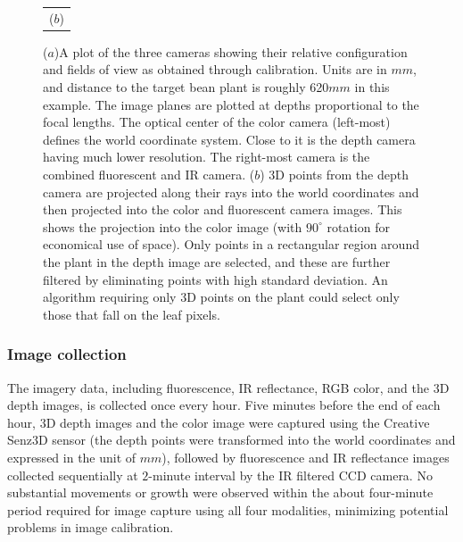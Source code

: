 \begin{figure}
\begin{tabular}{c}
  ($b$)\\
\end{tabular}
\caption{($a$)A plot of the three cameras showing their relative configuration and fields of view as obtained through calibration.  Units are in $mm$, and distance to the target bean plant is roughly 620$mm$ in this example.  The image planes are plotted at depths proportional to the focal lengths.  The optical center of the color camera (left-most) defines the world coordinate system.  Close to it is the depth camera having much lower resolution.  The right-most camera is the combined fluorescent and IR camera. ($b$) $3$D points from the depth camera are projected along their rays into the world coordinates and then projected into the color and fluorescent camera images.  This shows the projection into the color image (with $90^{\circ}$ rotation for economical use of space).  Only points in a rectangular region around the plant in the depth image are selected, and these are further filtered by eliminating points with high standard deviation.  An algorithm requiring only $3$D points on the plant could select only those that fall on the leaf pixels.}
\label{fig:CameraConfiguration}
\end{figure}

\subsubsection{Image collection}
The imagery data, including fluorescence, IR reflectance,  RGB color, and the $3$D depth images, is collected once every hour.
%
Five minutes before the end of each hour, $3$D depth images and the color image were captured using the Creative Senz3D sensor (the depth points were transformed into the world coordinates and expressed in the unit of $mm$), followed by fluorescence and IR reflectance images collected sequentially at $2$-minute interval by the IR filtered CCD camera.
%
No substantial movements or growth were observed within the about four-minute period required for image capture using all four modalities, minimizing potential problems in image calibration.

%

